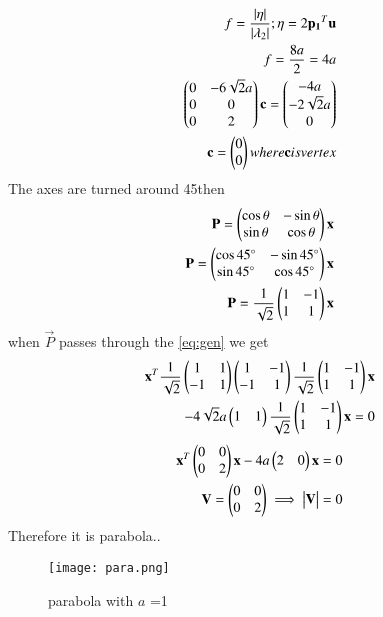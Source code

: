 \documentclass[journal,12pt,twocolumn]{IEEEtran}
\begin{document}
\begin{align}
    f=\frac{|\eta|}{|\lambda{_2}|} ; \eta=2\mathbf{p_1}^T\mathbf{u}\\
    f= \frac{8a}{2}=4a\\
    \begin{pmatrix}0 &-6\sqrt{2}a \\ 0 & 0 \\ 0 & 2\end{pmatrix}\mathbf{c}=\begin{pmatrix}-4a\\-2\sqrt{2}a\\0\\\end{pmatrix}\\
    \mathbf{c}=\begin{pmatrix}0\\0\end{pmatrix} where \mathbf{c} is vertex
\end{align}
The axes are turned around 45\degree then 
\begin{align}
    \mathbf{P}=\begin{pmatrix}\cos\theta & -\sin\theta \\ \sin\theta & \cos\theta\end{pmatrix}\mathbf{x}\\
    \mathbf{P}=\begin{pmatrix}\cos45\degree & -\sin45\degree \\ \sin45\degree & \cos45\degree\end{pmatrix}\mathbf{x}\\
    \mathbf{P} = \frac{1}{\sqrt{2}}\begin{pmatrix}1&-1\\1&1\end{pmatrix}\mathbf{x}
\end{align}
when $\vec{P}$ passes through the \eqref{eq:gen} we get
\begin{multline}
\begin{aligned}
\mathbf{x}^T\frac{1}{\sqrt{2}}\begin{pmatrix}1&1\\-1&1\end{pmatrix}\begin{pmatrix}1&-1\\-1&1\end{pmatrix}\frac{1}{\sqrt{2}}\begin{pmatrix}1&-1\\1&1\end{pmatrix}\mathbf{x}\\-4\sqrt{2}a\begin{pmatrix}1&1\end{pmatrix}\frac{1}{\sqrt{2}}\begin{pmatrix}1&-1\\1&1\end{pmatrix}\mathbf{x}=0
\end{aligned}
\end{multline}
\begin{align}
    \mathbf{x}^T\begin{pmatrix}0&0\\0&2\end{pmatrix}\mathbf{x}-4a\begin{pmatrix}2&0\end{pmatrix}\mathbf{x}=0\\
    \mathbf{V}=\begin{pmatrix}0&0\\0&2\end{pmatrix}\implies\begin{vmatrix}\mathbf{V}\end{vmatrix}=0
\end{align}
Therefore it is parabola..
\begin{figure}[!ht]
\centering
\texttt{[image: para.png]}
\caption{ parabola with $a$ =1}
\label{Fig}
\end{figure}
\end{document}
